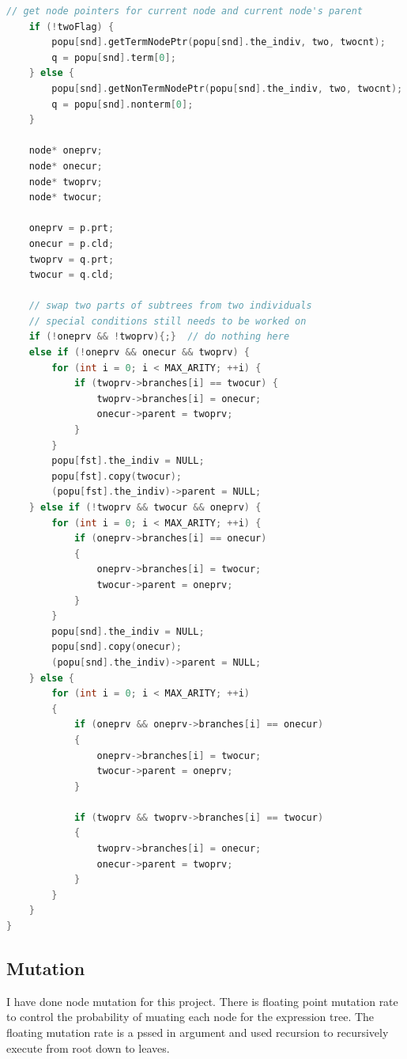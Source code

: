 \documentclass[10pt,b5paper]{article}
\begin{document}
\begin{lstlisting}[language=c++]
    // get node pointers for current node and current node's parent
    if (!twoFlag) {        
        popu[snd].getTermNodePtr(popu[snd].the_indiv, two, twocnt);
        q = popu[snd].term[0];
    } else {        
        popu[snd].getNonTermNodePtr(popu[snd].the_indiv, two, twocnt);
        q = popu[snd].nonterm[0];
    }

    node* oneprv;
    node* onecur;
    node* twoprv;
    node* twocur;
    
    oneprv = p.prt;
    onecur = p.cld;
    twoprv = q.prt;
    twocur = q.cld;

    // swap two parts of subtrees from two individuals
    // special conditions still needs to be worked on
    if (!oneprv && !twoprv){;}  // do nothing here
    else if (!oneprv && onecur && twoprv) {    
        for (int i = 0; i < MAX_ARITY; ++i) {        
            if (twoprv->branches[i] == twocur) {            
                twoprv->branches[i] = onecur;
                onecur->parent = twoprv;
            }
        }
        popu[fst].the_indiv = NULL;
        popu[fst].copy(twocur);
        (popu[fst].the_indiv)->parent = NULL;
    } else if (!twoprv && twocur && oneprv) {
        for (int i = 0; i < MAX_ARITY; ++i) {        
            if (oneprv->branches[i] == onecur) 
            {
                oneprv->branches[i] = twocur;
                twocur->parent = oneprv;
            }
        }
        popu[snd].the_indiv = NULL;
        popu[snd].copy(onecur);
        (popu[snd].the_indiv)->parent = NULL;
    } else {    
        for (int i = 0; i < MAX_ARITY; ++i) 
        {
            if (oneprv && oneprv->branches[i] == onecur) 
            {
                oneprv->branches[i] = twocur;
                twocur->parent = oneprv;
            }
        
            if (twoprv && twoprv->branches[i] == twocur)
            {
                twoprv->branches[i] = onecur;
                onecur->parent = twoprv;
            }
        }
    }
}
\end{lstlisting}
\subsection{Mutation}
\label{sec-1-4}
I have done node mutation for this project. There is floating point mutation rate to control the probability of muating each node for the expression tree. The floating mutation rate is a pssed in argument and used recursion to recursively execute from root down to leaves. 
\end{document}
